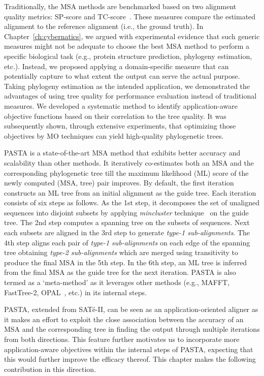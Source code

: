 Traditionally, the MSA methods are benchmarked based on two alignment quality metrics: SP-score and TC-score~\cite{warnow2017computational}. These measures compare the estimated alignment to the reference alignment (i.e., the ground truth). In Chapter~\ref{ch:cybernatics}, we argued with experimental evidence that such generic measures might not be adequate to choose the best MSA method to perform a specific biological task (e.g., protein structure prediction, phylogeny estimation, etc.). Instead, we proposed applying a domain-specific measure that can potentially capture to what extent the output can serve the actual purpose. Taking phylogeny estimation as the intended application, we demonstrated the advantages of using tree quality for performance evaluation instead of traditional measures. We developed a systematic method to identify application-aware objective functions based on their correlation to the tree quality. It was subsequently shown, through extensive experiments, that optimizing those objectives by MO techniques can yield high-quality phylogenetic trees.


PASTA is a state-of-the-art MSA method that exhibits better accuracy and scalability than other methods. It iteratively co-estimates both an MSA and the corresponding phylogenetic tree till the maximum likelihood (ML) score of the newly computed (MSA, tree) pair improves. By default, the first iteration constructs an ML tree from an initial alignment as the guide tree. Each iteration consists of six steps as follows. As the 1st step, it decomposes the set of unaligned sequences into disjoint subsets by applying \textit{mincluster} technique~\cite{balaban2019treecluster} on the guide tree. The 2nd step computes a spanning tree on the subsets of sequences. Next each subsets are aligned in the 3rd step to generate \textit{type-1 sub-alignments}. The 4th step aligns each pair of \textit{type-1 sub-alignments} on each edge of the spanning tree obtaining \textit{type-2 sub-alignments} which are merged using transitivity to produce the final MSA in the 5th step. In the 6th step, an ML tree is inferred from the final MSA as the guide tree for the next iteration. PASTA is also termed as a `meta-method' as it leverages other methods (e.g., MAFFT, FastTree-2, OPAL~\cite{wheeler2007multiple}, etc.) in its internal steps. 

PASTA, extended from SAT\'e-II, can be seen as an application-oriented aligner 
as it makes an effort to exploit the close association between the
accuracy of an MSA and the corresponding tree in finding the output through multiple iterations from both directions. 
This feature further motivates us to incorporate more application-aware objectives within the internal steps of PASTA, expecting that this would further improve the efficacy thereof. This chapter makes the following contribution in this direction. 

